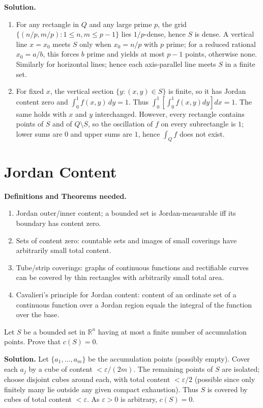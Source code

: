 \noindent\textbf{Solution.}
\begin{enumerate}[label=(\alph*)]
    \item For any rectangle in $Q$ and any large prime $p$, the grid $\{(n/p,m/p):1\le n,m\le p-1\}$ lies $1/p$-dense, hence $S$ is dense. A vertical line $x=x_0$ meets $S$ only when $x_0=n/p$ with $p$ prime; for a reduced rational $x_0=a/b$, this forces $b$ prime and yields at most $p-1$ points, otherwise none. Similarly for horizontal lines; hence each axis-parallel line meets $S$ in a finite set.
    \item For fixed $x$, the vertical section $\{y:(x,y)\in S\}$ is finite, so it has Jordan content zero and $\int_0^1 f(x,y)\,dy=1$. Thus $\int_0^1\![\int_0^1 f(x,y)dy]dx=1$. The same holds with $x$ and $y$ interchanged. However, every rectangle contains points of $S$ and of $Q\setminus S$, so the oscillation of $f$ on every subrectangle is $1$; lower sums are $0$ and upper sums are $1$, hence $\int_Q f$ does not exist.
\end{enumerate}

\section{Jordan Content}
\noindent\textbf{Definitions and Theorems needed.}
\begin{enumerate}[label=(\roman*)]
    \item Jordan outer/inner content; a bounded set is Jordan-measurable iff its boundary has content zero.
    \item Sets of content zero: countable sets and images of small coverings have arbitrarily small total content.
    \item Tube/strip coverings: graphs of continuous functions and rectifiable curves can be covered by thin rectangles with arbitrarily small total area.
    \item Cavalieri’s principle for Jordan content: content of an ordinate set of a continuous function over a Jordan region equals the integral of the function over the base.
\end{enumerate}

\begin{problembox}
Let \( S \) be a bounded set in \( \mathbb{R}^n \) having at most a finite number of accumulation points. Prove that \( c(S) = 0 \).
\end{problembox}

\noindent\textbf{Solution.}
Let $\{a_1,\dots,a_m\}$ be the accumulation points (possibly empty). Cover each $a_j$ by a cube of content $<\varepsilon/(2m)$. The remaining points of $S$ are isolated; choose disjoint cubes around each, with total content $<\varepsilon/2$ (possible since only finitely many lie outside any given compact exhaustion). Thus $S$ is covered by cubes of total content $<\varepsilon$. As $\varepsilon>0$ is arbitrary, $c(S)=0$.

